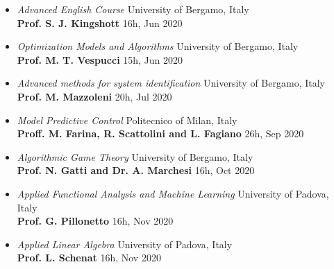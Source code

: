 \documentclass[10pt]{article}
\begin{document}
\begin{itemize}
	\item \textit{Advanced English Course} \hfill University of Bergamo, Italy\\
	\textbf{Prof. S. J. Kingshott} \hfill 16h, Jun 2020\\
	
	\item \textit{Optimization Models and Algorithms} \hfill University of Bergamo, Italy\\
	\textbf{Prof. M. T. Vespucci} \hfill 15h, Jun 2020\\
	
	\item \textit{Advanced methods for system identification} \hfill University of Bergamo, Italy\\
	\textbf{Prof. M. Mazzoleni} \hfill 20h, Jul 2020\\
	
	\item \textit{Model Predictive Control} \hfill Politecnico of Milan, Italy\\
	\textbf{Proff. M. Farina, R. Scattolini and L. Fagiano} \hfill 26h, Sep 2020\\

	\item \textit{Algorithmic Game Theory} \hfill University of Bergamo, Italy\\
	\textbf{Prof. N. Gatti and Dr. A. Marchesi} \hfill 16h, Oct 2020\\

	\item \textit{Applied Functional Analysis and Machine Learning} \hfill University of Padova, Italy\\
	\textbf{Prof. G. Pillonetto} \hfill 16h, Nov 2020\\

	\item \textit{Applied Linear Algebra} \hfill University of Padova, Italy\\
	\textbf{Prof. L. Schenat} \hfill 16h, Nov 2020\\

	
\end{itemize}

\clearpage

\vspace{6pt} %
\end{document}
